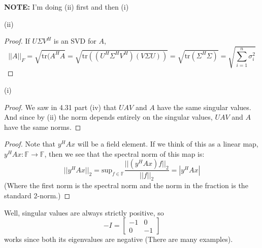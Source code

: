 \documentclass[12pt]{article}
\newenvironment{problem}[2][Problem]{\begin{trivlist}
\item[\hskip \labelsep {\bfseries #1}\hskip \labelsep {\bfseries #2.}]}{\end{trivlist}}
\theoremstyle{definition}
\theoremstyle{definition}
\theoremstyle{definition}
\theoremstyle{definition}
\begin{document}
\begin{problem}{4.32} \textbf{NOTE:} I'm doing (ii) first and then (i)
\item (ii)
\begin{proof}
If $U\Sigma V^H$ is an SVD for $A$,
$$ ||A||_F = \sqrt{\text{tr}(A^HA} = \sqrt{\text{tr}((U^H  \Sigma^H V^H)(V \Sigma U))} = \sqrt{\text{tr}(\Sigma^H\Sigma)} = \sqrt{\sum_{i=1}^n \sigma_i^2} $$
\end{proof}
\item (i)
\begin{proof}
We saw in 4.31 part (iv) that $UAV$ and $A$ have the same singular values. And since by (ii) the norm depends entirely on the singular values, $UAV$ and $A$ have the same norms.
\end{proof}
\end{problem}

\begin{problem}{4.33}
\begin{proof}
Note that $y^HAx$ will be a field element. If we think of this as a linear map, $y^HAx: \mathbb{F} \to \mathbb{F}$, then we see that the spectral norm of this map is:
$$||y^HAx||_2 = \text{sup}_{f \in \mathbb{F}} \frac{||(y^HAx)f||_2}{||f||_2} = |y^HAx| $$ (Where the first norm is the spectral norm and the norm in the fraction is the standard 2-norm.) 
\end{proof}
\end{problem}

\begin{problem}{4.36}
Well, singular values are always strictly positive, so 
$$
-I = \begin{bmatrix}
-1 & 0 \\
0 & -1
\end{bmatrix}
$$
works since both its eigenvalues are negative (There are many examples).
\end{problem}
\end{document}
